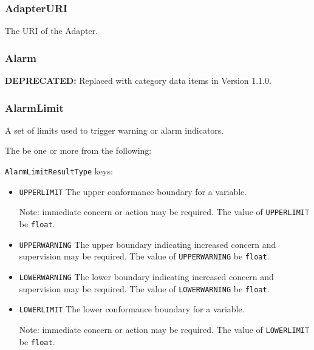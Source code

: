 \subsubsection{AdapterURI}
\label{sec:AdapterURI}



The \gls{URI} of the \gls{Adapter}.



\subsubsection{Alarm}
\label{sec:Alarm}



\textbf{DEPRECATED:} Replaced with  category data items in Version 1.1.0.



\subsubsection{AlarmLimit}
\label{sec:AlarmLimit}



A set of limits used to trigger warning or alarm indicators.


The   \MUST be one or more from the following:

\texttt{AlarmLimitResultType} keys:

\begin{itemize}
\item \texttt{UPPER\textunderscore LIMIT} \newline The upper conformance boundary for a variable.

\newline Note: immediate concern or action may be required. 
\newline The value of \texttt{UPPER\textunderscore LIMIT} \MUST be \texttt{float}.

\item \texttt{UPPER\textunderscore WARNING} \newline The upper boundary indicating increased concern and supervision may be required. 
\newline The value of \texttt{UPPER\textunderscore WARNING} \MUST be \texttt{float}.

\item \texttt{LOWER\textunderscore WARNING} \newline The lower boundary indicating increased concern and supervision may be required. 
\newline The value of \texttt{LOWER\textunderscore WARNING} \MUST be \texttt{float}.

\item \texttt{LOWER\textunderscore LIMIT} \newline The lower conformance boundary for a variable.

\newline Note: immediate concern or action may be required. 
\newline The value of \texttt{LOWER\textunderscore LIMIT} \MUST be \texttt{float}.

\end{itemize}



